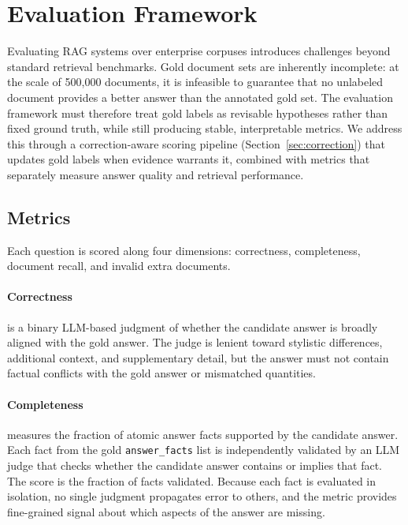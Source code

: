 \documentclass{article}
\begin{document}
\section{Evaluation Framework}
\label{sec:evaluation}

Evaluating RAG systems over enterprise corpuses introduces challenges beyond standard retrieval benchmarks. Gold document sets are inherently incomplete: at the scale of 500,000 documents, it is infeasible to guarantee that no unlabeled document provides a better answer than the annotated gold set. The evaluation framework must therefore treat gold labels as revisable hypotheses rather than fixed ground truth, while still producing stable, interpretable metrics. We address this through a correction-aware scoring pipeline (Section~\ref{sec:correction}) that updates gold labels when evidence warrants it, combined with metrics that separately measure answer quality and retrieval performance.

\subsection{Metrics}
\label{sec:metrics}

Each question is scored along four dimensions: correctness, completeness, document recall, and invalid extra documents.

\paragraph{Correctness} is a binary LLM-based judgment of whether the candidate answer is broadly aligned with the gold answer. The judge is lenient toward stylistic differences, additional context, and supplementary detail, but the answer must not contain factual conflicts with the gold answer or mismatched quantities.

\paragraph{Completeness} measures the fraction of atomic answer facts supported by the candidate answer. Each fact from the gold \texttt{answer\_facts} list is independently validated by an LLM judge that checks whether the candidate answer contains or implies that fact. The score is the fraction of facts validated. Because each fact is evaluated in isolation, no single judgment propagates error to others, and the metric provides fine-grained signal about which aspects of the answer are missing.
\end{document}

